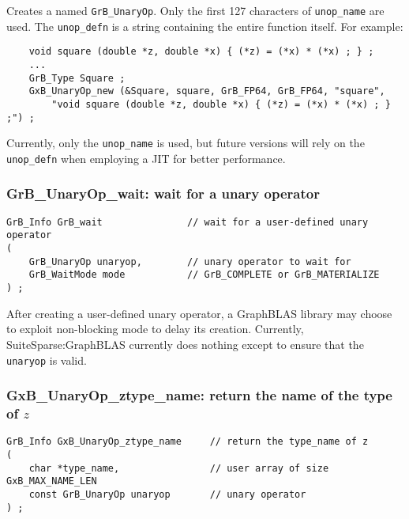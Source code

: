 \documentclass[12pt]{article}
\begin{document}
Creates a named \verb'GrB_UnaryOp'.  Only the first 127 characters of
\verb'unop_name' are used.  The \verb'unop_defn' is a string containing the
entire function itself.  For example:

    {\footnotesize
    \begin{verbatim}
    void square (double *z, double *x) { (*z) = (*x) * (*x) ; } ;
    ...
    GrB_Type Square ;
    GxB_UnaryOp_new (&Square, square, GrB_FP64, GrB_FP64, "square",
        "void square (double *z, double *x) { (*z) = (*x) * (*x) ; } ;") ;
    \end{verbatim}}

Currently, only the \verb'unop_name' is used, but future versions will
rely on the \verb'unop_defn' when employing a JIT for better performance.

\subsubsection{{\sf GrB\_UnaryOp\_wait:} wait for a unary operator}
\label{unaryop_wait}

\begin{mdframed}[userdefinedwidth=6in]
{\footnotesize
\begin{verbatim}
GrB_Info GrB_wait               // wait for a user-defined unary operator
(
    GrB_UnaryOp unaryop,        // unary operator to wait for
    GrB_WaitMode mode           // GrB_COMPLETE or GrB_MATERIALIZE
) ;
\end{verbatim}
}\end{mdframed}

After creating a user-defined unary operator, a GraphBLAS library may choose to
exploit non-blocking mode to delay its creation.  Currently,
SuiteSparse:GraphBLAS currently does nothing except to ensure that the
\verb'unaryop' is valid.

\newpage
\subsubsection{{\sf GxB\_UnaryOp\_ztype\_name:} return the name of the type of $z$}
\label{unaryop_ztype_name}

\begin{mdframed}[userdefinedwidth=6in]
{\footnotesize
\begin{verbatim}
GrB_Info GxB_UnaryOp_ztype_name     // return the type_name of z
(
    char *type_name,                // user array of size GxB_MAX_NAME_LEN
    const GrB_UnaryOp unaryop       // unary operator
) ;
\end{verbatim}
}\end{mdframed}
\end{document}
